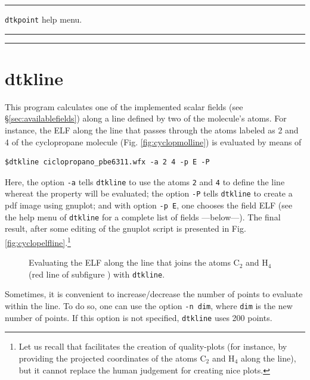 \rule{\textwidth}{1pt}
{\center\texttt{dtkpoint} help menu.\\}
\rule{\textwidth}{1pt}
\begin{small}
\end{small}
\rule{\textwidth}{1pt}

\section{dtkline}
This program calculates one of the implemented scalar fields (see \S\ref{sec:availablefields}) along a line defined by two of the molecule's atoms. For instance, the ELF along the line that passes through the atoms labeled as 2 and 4 of the cyclopropane molecule (Fig. \ref{fig:cyclopmolline}) is evaluated by means of\\
\begin{lstlisting}
$dtkline ciclopropano_pbe6311.wfx -a 2 4 -p E -P
\end{lstlisting}
Here, the option \texttt{-a} tells \texttt{dtkline} to use the atoms \texttt{2} and \texttt{4} to define the line whereat the property will be evaluated; the option \texttt{-P} tells \texttt{dtkline} to create a pdf image using gnuplot; and with option \texttt{-p E}, one chooses the field ELF (see the help menu of \texttt{dtkline} for a complete list of fields ---below---). The final result, after some editing of the gnuplot script is presented in Fig. \ref{fig:cyclopelfline}.\footnote{Let us recall that \DTK{} facilitates the creation of quality-plots (for instance, by providing the projected coordinates of the atoms C$_2$ and H$_4$ along the line), but it cannot replace the human judgement for creating nice plots.}
\begin{figure}[hb!]
\centering
{}\quad%
\caption{Evaluating the ELF along the line that joins the atoms C$_2$ and H$_4$ (red line
of subfigure ) with \texttt{dtkline}.}\label{fig:dtklineuseex}
\end{figure}

Sometimes, it is convenient to increase/decrease the number of points to evaluate within the line. To do so, one can use the option \texttt{-n dim}, where \texttt{dim} is the new number of points. If this option is not specified, \texttt{dtkline} uses 200 points.

